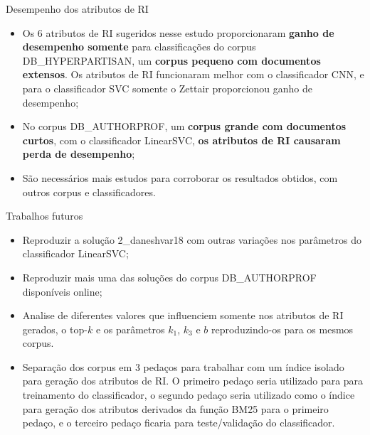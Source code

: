 \documentclass[%
  10pt,%
  aspectratio = 169,%
  compress,%
  t,%
]{beamer}%
\begin{document}
    \begin{frame}{}{Desempenho dos atributos de RI}
        \begin{itemize}
            \item Os 6 atributos de RI sugeridos nesse estudo proporcionaram \textbf{ganho de desempenho somente} para classificações do corpus DB\_HYPERPARTISAN, um \textbf{corpus pequeno com documentos extensos}.
            Os atributos de RI funcionaram melhor com o classificador CNN, e para o classificador SVC somente o Zettair proporcionou ganho de desempenho;
            
            \item No corpus DB\_AUTHORPROF, um \textbf{corpus grande com documentos curtos}, com o classificador LinearSVC, \textbf{os atributos de RI causaram perda de desempenho};
            
            \item São necessários mais estudos para corroborar os resultados obtidos, com outros corpus e classificadores.

        \end{itemize}
    \end{frame}
    \begin{frame}{}{Trabalhos futuros}
        \begin{itemize}
            \item Reproduzir a solução 2\_daneshvar18 com outras variações nos parâmetros do classificador LinearSVC;
            
            \item Reproduzir mais uma das soluções do corpus DB\_AUTHORPROF disponíveis online;
            
            \item Analise de diferentes valores que influenciem somente nos atributos de RI gerados, o top-$k$ e os parâmetros $k_1$, $k_3$ e $b$ reproduzindo-os para os mesmos corpus.

            \item Separação dos corpus em 3 pedaços para trabalhar com um índice isolado para geração dos atributos de RI.
            O primeiro pedaço seria utilizado para para treinamento do classificador, o segundo pedaço seria utilizado como o índice para geração dos atributos derivados da função BM25 para o primeiro pedaço, e o terceiro pedaço ficaria para teste/validação do classificador.
        \end{itemize}
    \end{frame}
\end{document}
